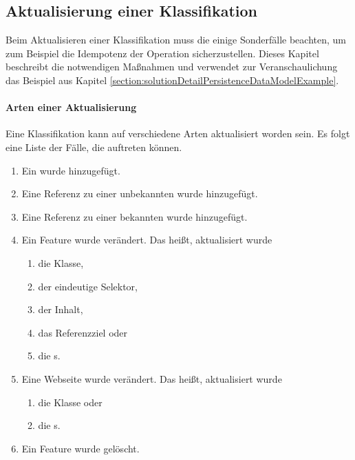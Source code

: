 \subsection{Aktualisierung einer Klassifikation}
    \label{section:solutionDetailsClassificationStorageAPIUpdatePage}
    Beim Aktualisieren einer Klassifikation muss die {\classificationStorageAPI}
    einige Sonderfälle beachten,
    um zum Beispiel die Idempotenz der Operation sicherzustellen.
    Dieses Kapitel beschreibt die notwendigen Maßnahmen und verwendet
    zur Veranschaulichung das Beispiel
    aus Kapitel \ref{section:solutionDetailPersistenceDataModelExample}.

    \paragraph*{Arten einer Aktualisierung}
    Eine Klassifikation kann auf verschiedene Arten aktualisiert worden sein.
    Es folgt eine Liste der Fälle, die auftreten können.

    \begin{enumerate}
        \item Ein {\contentFeature} wurde hinzugefügt.
        \item Eine Referenz zu einer unbekannten {\resource} wurde hinzugefügt.
        \item Eine Referenz zu einer bekannten {\resource} wurde hinzugefügt.
        \item Ein Feature wurde verändert. Das heißt, aktualisiert wurde
                \begin{enumerate}
                    \item die Klasse,
                    \item der eindeutige Selektor,
                    \item der Inhalt,
                    \item das Referenzziel oder
                    \item die {\childFeature}s.
                \end{enumerate}
        \item Eine Webseite wurde verändert. Das heißt, aktualisiert wurde
            \begin{enumerate}
                \item die Klasse oder
                \item die {\childFeature}s.
            \end{enumerate}
        \item Ein Feature wurde gelöscht.
    \end{enumerate}

